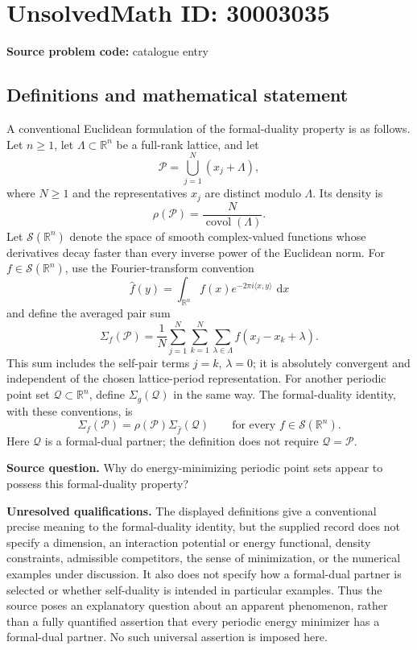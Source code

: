\documentclass[11pt]{article}
\newcommand{\R}{\mathbb{R}}
\newcommand{\dd}{\,\mathrm{d}}
\begin{document}
\section*{UnsolvedMath ID: 30003035}
\textbf{Source problem code:} catalogue entry
\subsection{Definitions and mathematical statement}
A conventional Euclidean formulation of the formal-duality property is as follows. Let \(n\geq 1\), let \(\Lambda\subset\R^n\) be a full-rank lattice, and let
\[
\mathcal P=\bigcup_{j=1}^{N}(x_j+\Lambda),
\]
where \(N\geq1\) and the representatives \(x_j\) are distinct modulo \(\Lambda\). Its density is
\[
\rho(\mathcal P)=\frac{N}{\operatorname{covol}(\Lambda)}.
\]
Let \(\mathcal S(\R^n)\) denote the space of smooth complex-valued functions whose derivatives decay faster than every inverse power of the Euclidean norm. For \(f\in\mathcal S(\R^n)\), use the Fourier-transform convention
\[
\widehat f(y)=\int_{\R^n}f(x)e^{-2\pi i\langle x,y\rangle}\,\dd x
\]
and define the averaged pair sum
\[
\Sigma_f(\mathcal P)=\frac1N\sum_{j=1}^{N}\sum_{k=1}^{N}\sum_{\lambda\in\Lambda}
 f(x_j-x_k+\lambda).
\]
This sum includes the self-pair terms \(j=k\), \(\lambda=0\); it is absolutely convergent and independent of the chosen lattice-period representation. For another periodic point set \(\mathcal Q\subset\R^n\), define \(\Sigma_g(\mathcal Q)\) in the same way. The formal-duality identity, with these conventions, is
\[
\Sigma_f(\mathcal P)=\rho(\mathcal P)\Sigma_{\widehat f}(\mathcal Q)
\qquad\text{for every }f\in\mathcal S(\R^n).
\]
Here \(\mathcal Q\) is a formal-dual partner; the definition does not require \(\mathcal Q=\mathcal P\).

\textbf{Source question.} Why do energy-minimizing periodic point sets appear to possess this formal-duality property?

\textbf{Unresolved qualifications.} The displayed definitions give a conventional precise meaning to the formal-duality identity, but the supplied record does not specify a dimension, an interaction potential or energy functional, density constraints, admissible competitors, the sense of minimization, or the numerical examples under discussion. It also does not specify how a formal-dual partner is selected or whether self-duality is intended in particular examples. Thus the source poses an explanatory question about an apparent phenomenon, rather than a fully quantified assertion that every periodic energy minimizer has a formal-dual partner. No such universal assertion is imposed here.
\end{document}
